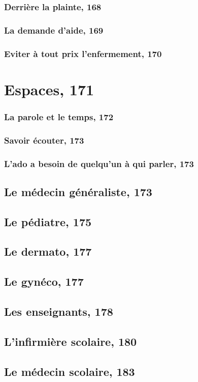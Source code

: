 \documentclass[12pt]{report}
\begin{document}
\begin{itemize}
\subsection{Derrière la plainte, 168}
\subsection{La demande d'aide, 169}
\subsection{Eviter à tout prix l'enfermement, 170}
\chapter{Espaces, 171}
\subsection{La parole et le temps, 172}
\subsection{Savoir écouter, 173}
\subsection{L'ado a besoin de quelqu'un à qui parler, 173}
\section{Le médecin généraliste, 173}
\section{Le pédiatre, 175}
\section{Le dermato, 177}
\section{Le gynéco, 177}
\section{Les enseignants, 178}
\section{L'infirmière scolaire, 180}
\section{Le médecin scolaire, 183}

\end{itemize}
\end{document}

